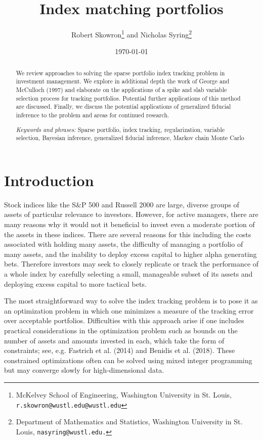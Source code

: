 \documentclass[a4paper, 12pt]{article}
\title{Index matching portfolios}
\author{Robert Skowron\footnote{McKelvey School of Engineering, Washington University in St. Louis, {\tt r.skowron@wustl.edu@wustl.edu}} \quad and \quad Nicholas Syring\footnote{Department of Mathematics and Statistics, Washington University in St. Louis,  {\tt nasyring@wustl.edu.}}}
\date{\today}
\theoremstyle{plain}
\theoremstyle{definition}
\theoremstyle{remark}
\begin{document}
\maketitle



\begin{abstract}
	We review approaches to solving the sparse portfolio index tracking problem in investment management. We explore in additional depth the work of George and McCulloch (1997) and elaborate on the applications of a spike and slab variable selection process for tracking portfolios. Potential further applications of this method are discussed. Finally, we discuss the potential applications of generalized fiducial inference to the problem and areas for continued research.


\smallskip

\emph{Keywords and phrases:} Sparse portfolio, index tracking, regularization, variable selection, Bayesian inference, generalized fiducial inference, Markov chain Monte Carlo

\end{abstract}


\section{Introduction}
\label{S:intro}

Stock indices like the S\&P 500 and Russell 2000 are large, diverse groups of assets of particular relevance to investors.  However, for active managers, there are many reasons why it would not it beneficial to invest even a moderate portion of the assets in these indices. There are several reasons for this including the costs associated with holding many assets, the difficulty of managing a portfolio of many assets, and the inability to deploy excess capital to higher alpha generating bets.  Therefore investors may seek to closely replicate or track the performance of a whole index by carefully selecting a small, manageable subset of its assets and deploying excess capital to more tactical bets.

The most straightforward way to solve the index tracking problem is to pose it as an optimization problem in which one minimizes a measure of the tracking error over acceptable portfolios.  Difficulties with this approach arise if one includes practical considerations in the optimization problem such as bounds on the number of assets and amounts invested in each, which take the form of constraints; see, e.g. Fastrich et al. (2014) and Benidis et al. (2018).  These constrained optimizations often can be solved using mixed integer programming but may converge slowly for high-dimensional data.
\end{document}
